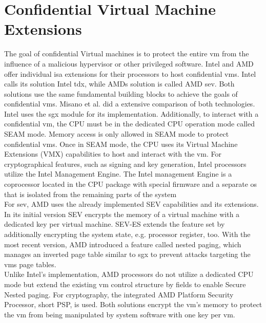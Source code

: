 \section{Confidential Virtual Machine Extensions}
\label{section:20:confidential_vms}
The goal of confidential Virtual machines is to protect the entire \gls{vm} from
the influence of a malicious hypervisor or other privileged software. Intel and
AMD offer individual \gls{isa} extensions for their processors to host
confidential \glspl{vm}. Intel calls its solution Intel \gls{tdx}, while AMDs
solution is called AMD \gls{sev}.\cite{tdx_whitepaper,kaplan_amd_2020} Both
solutions use the same fundamental building blocks to achieve the goals of
confidential \glspl{vm}. Misano et al. did a extensive comparison of both
technologies.\cite{misono_confidential_2024} Intel uses the \gls{sgx} module for
its implementation. Additionally, to interact with a confidential \gls{vm}, the
CPU must be in the dedicated CPU operation mode called SEAM mode. Memory access
is only allowed in SEAM mode to protect confidential \glspl{vm}. Once in SEAM
mode, the CPU uses its Virtual Machine Extensions (VMX) capabilities to host and
interact with the \gls{vm}. For cryptographical features, such as signing and
key generation, Intel processors utilize the Intel Management Engine. The Intel
management Engine is a coprocessor located in the CPU package with special
firmware and a separate \gls{os} that is isolated from the remaining parts of
the system\\

For \gls{sev}, AMD uses the already implemented SEV capabilities and its
extensions. In its initial version SEV encrypts the memory of a virtual machine
with a dedicated key per virtual machine. SEV-ES extends the feature set by
additionally encrypting the system state, e.g. processor register, too. With the
most recent version, AMD introduced a feature called nested paging, which
manages an inverted page table similar to \gls{sgx} to prevent attacks targeting
the \gls{vm}s page tables.\\

Unlike Intel's implementation, AMD processors do not utilize a dedicated CPU
mode but extend the existing \gls{vm} control structure by fields to enable
Secure Nested paging. For cryptography, the integrated AMD Platform Security
Processor, short PSP, is used. Both solutions encrypt the \gls{vm}'s memory to
protect the \gls{vm} from being manipulated by system software with one key per
\gls{vm}.\\

